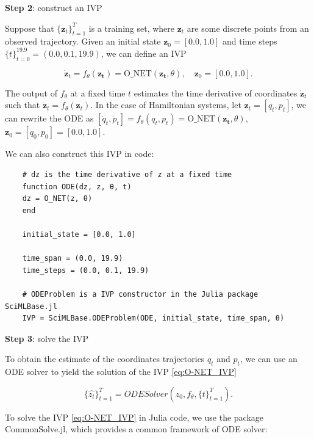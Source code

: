 \documentclass[
	parskip, 			   %
	twoside, 			   %
	DIV=14, 			   %
	BCOR=15.0mm, 		   %
	headsepline, 		   %
	open=right, 		   %
	captions=tableheading, %
	bibliography=totoc,    %
	numbers=noenddot       %
]{scrreprt}
\begin{document}
\textbf{Step 2}: construct an IVP

Suppose that $\{ \mathbf{z}_{t} \}_{t=1}^{T}$ is a training set, where $\mathbf{z}_{t}$ are some discrete points from an observed trajectory. Given an initial state $\mathbf{z}_{0}=[0.0, 1.0]$ and time steps $\{ t \}_{t=0}^{19.9} = (0.0, 0.1, 19.9)$, we can define an IVP

\begin{equation}
    \label{eq:O-NET_IVP}
    \dot{\mathbf{z}}_t = f_{\theta}(\mathbf{z_t}) = \text{O\_NET}(\mathbf{z_t}, \theta), \quad \mathbf{z}_{0}=[0.0, 1.0].
\end{equation}

The output of $f_{\theta}$ at a fixed time $t$ estimates the time derivative of coordinates $\dot{\mathbf{z}}_{t}$ such that $\dot{ \mathbf{z}}_{t} = f_{\theta}(\mathbf{z}_t)$. In the case of Hamiltonian systems, let $\mathbf{z}_{t} = [q_{t}, p_{t}]$, we can rewrite the ODE as $[\dot q_{t}, \dot p_{t}] = f_{\theta}(q_t, p_t) = \text{O\_NET}(\mathbf{z_t}, \theta)$, $\mathbf{z}_{0}= [q_{0}, p_{0}] = [0.0, 1.0]$.

We can also construct this IVP in code:

\begin{verbatim}
    # dz is the time derivative of z at a fixed time
    function ODE(dz, z, θ, t)
    dz = O_NET(z, θ)
    end
    
    initial_state = [0.0, 1.0]
    
    time_span = (0.0, 19.9)
    time_steps = (0.0, 0.1, 19.9)
    
    # ODEProblem is a IVP constructor in the Julia package SciMLBase.jl
    IVP = SciMLBase.ODEProblem(ODE, initial_state, time_span, θ)
\end{verbatim}

\textbf{Step 3}: solve the IVP

To obtain the estimate of the coordinates trajectories $q_t$ and $p_t$, we can use an ODE solver to yield the solution of the IVP \ref{eq:O-NET_IVP}

\begin{equation}
    \label{eq:O-NET_solver}
    \{ \hat{z_{t}} \}_{t=1}^{T} = ODESolver(z_{0}, f_{\theta}, \{ t \}_{t=1}^{T}).
\end{equation}

To solve the IVP \ref{eq:O-NET_IVP} in Julia code, we use the package CommonSolve.jl, which provides a common framework of ODE solver:
\end{document}
